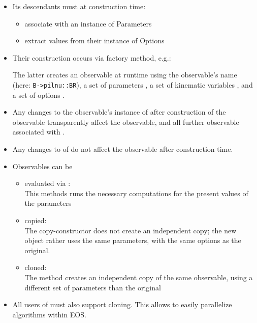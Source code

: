 \begin{itemize}
    \item Its descendants must at construction time:
        \begin{itemize}
            \item associate with an instance of Parameters
            \item extract values from their instance of Options
        \end{itemize}

    \item Their construction occurs via factory method, e.g.:\\

       The latter creates an observable at runtime using the observable's name (here:
       \texttt{B->pilnu::BR}), a set of parameters , a set of kinematic variables ,
       and a set of options .

    \item Any changes to the observable's instance  of  after construction
       of the observable transparently affect the observable, and all further observable associated with .

    \item Any changes to  of  do not affect the observable after construction time.

    \item Observables can be
        \begin{itemize}
            \item evaluated via :\\[\smallskipamount]
              This methods runs the necessary computations for the present values of the parameters\\[\smallskipamount]

            \item copied:\\[\smallskipamount]
              The copy-constructor does not create an independent copy; the new object rather uses the same
              parameters, with the same options as the original.\\[\smallskipamount]

            \item cloned:\\[\smallskipamount]
              The method  creates an independent copy of the same observable, using a different set of
              parameters than the original
        \end{itemize}

    \item All users of  must also support cloning. This allows to easily parallelize algorithms
        within EOS.
\end{itemize}

